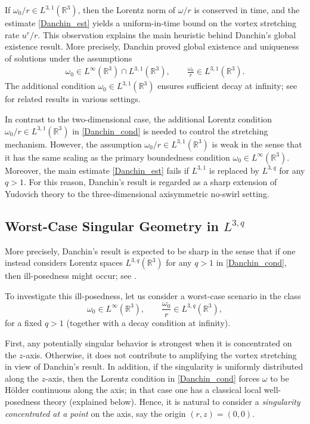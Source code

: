 \documentclass[reqno,11pt]{amsart}
\begin{document}
If $\omega_0/r \in L^{3,1}(\mathbb{R}^3)$, then the Lorentz norm of $\omega/r$ is conserved in time, and the estimate \eqref{Danchin_est} yields a uniform-in-time bound on the vortex stretching rate $u^r/r$. This observation explains the main heuristic behind Danchin’s global existence result. More precisely, Danchin proved global existence and uniqueness of solutions under the assumptions
\begin{align}
\label{Danchin_cond}
\omega_0 \in L^\infty(\mathbb{R}^3) \cap L^{3,1}(\mathbb{R}^3),
\qquad
\frac{\omega_0}{r} \in L^{3,1}(\mathbb{R}^3).
\end{align}
The additional condition $\omega_0 \in L^{3,1}(\mathbb{R}^3)$ ensures sufficient decay at infinity; see
\cite{Serfati94, Saint-Raymond94, ShirotaYanagisawa94, AbidiHmidiKeraani10} for related results in various settings.

In contrast to the two-dimensional case, the additional Lorentz condition $\omega_0/r\in L^{3,1}(\mathbb{R}^3)$ in \eqref{Danchin_cond} is needed to control the stretching mechanism.
However, the assumption $\omega_0/r \in L^{3,1}(\mathbb{R}^3)$ is weak in the sense that it has the same scaling as the primary boundedness condition $\omega_0 \in L^\infty(\mathbb{R}^3)$. Moreover, the main estimate \eqref{Danchin_est} fails if $L^{3,1}$ is replaced by $L^{3,q}$ for any $q>1$. For this reason, Danchin’s result is  regarded as a sharp extension of Yudovich theory to the three-dimensional axisymmetric no-swirl setting.




\subsection{Worst-Case Singular Geometry in \texorpdfstring{$L^{3,q}$}{L3q}}\label{General_L_space}



More precisely, Danchin's result is expected to be sharp in the sense that if one
instead considers Lorentz spaces $L^{3,q}(\mathbb{R}^3)$ for any $q>1$ in
\eqref{Danchin_cond}, then ill-posedness might occur; see
\cite[p.~32, footnote~3]{LimJeong25}.

To investigate this ill-posedness, let us consider a worst-case scenario in the
class
\[
\omega_0 \in L^\infty(\mathbb{R}^3),
\qquad
\frac{\omega_0}{r} \in L^{3,q}(\mathbb{R}^3),
\]
for a fixed $q>1$ (together with a decay condition at infinity).

First, any potentially singular behavior is strongest when it is concentrated on the $z$-axis. 
Otherwise,
it does not contribute to amplifying the vortex stretching in view of Danchin's
result. In addition, if the singularity is uniformly distributed along the $z$-axis, then the Lorentz
condition in \eqref{Danchin_cond} forces $\omega$ to be H\"older continuous along
the axis; in that case one has a classical local well-posedness theory (explained
below). Hence, it is natural  to consider a \emph{singularity concentrated at a point}
on the axis, say the origin $(r,z)=(0,0)$.
\end{document}
